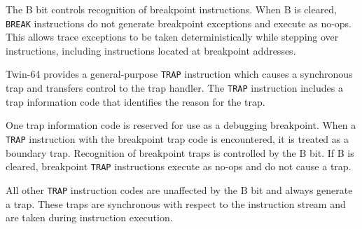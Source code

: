 The B bit controls recognition of breakpoint instructions. When B is cleared, \texttt{BREAK} instructions do not generate breakpoint exceptions and execute as no-ops. This allows trace exceptions to be taken deterministically while stepping over instructions, including instructions located at breakpoint addresses.

Twin-64 provides a general-purpose \texttt{TRAP} instruction which causes a synchronous trap and transfers control to the trap handler. The \texttt{TRAP} instruction includes a trap information code that identifies the reason for the trap.

One trap information code is reserved for use as a debugging breakpoint. When a \texttt{TRAP} instruction with the breakpoint trap code is encountered, it is treated as a boundary trap. Recognition of breakpoint traps is controlled by the B bit. If B is cleared, breakpoint \texttt{TRAP} instructions execute as no-ops and do not cause a trap.

All other \texttt{TRAP} instruction codes are unaffected by the B bit and always generate a trap. These traps are synchronous with respect to the instruction stream and are taken during instruction execution.

